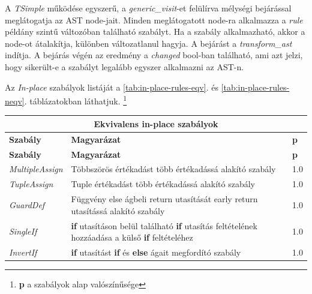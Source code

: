 A \emph{TSimple} működése egyszerű,
a \emph{generic\_visit}-et felülírva mélységi bejárással meglátogatja az AST node-jait.
Minden meglátogatott node-ra alkalmazza
a \emph{rule} példány szintű változóban található szabályt.
Ha a szabály alkalmazható, akkor a node-ot átalakítja, különben változatlanul hagyja.
A bejárást a \emph{transform\_ast} indítja.
A bejárás végén az eredmény a \emph{changed} bool-ban található,
ami azt jelzi, hogy sikerült-e a szabályt legalább egyszer alkalmazni az AST-n.

Az \emph{In-place} szabályok listáját a \ref{tab:in-place-rules-eqv}. és \ref{tab:in-place-rules-neqv}.
táblázatokban láthatjuk.
\footnote{\textbf{p} a szabályok alap valószínűsége}

\begin{center}
	\begin{longtable}{ | p{} | p{} | p{} | }
		\hline
		\multicolumn{3}{|c|}{\textbf{Ekvivalens in-place szabályok}}
		\\ \hline
		
		\textbf{Szabály} & \textbf{Magyarázat} & \textbf{p}
		\\ \hline \hline
		\endfirsthead %
		
		\hline
		\textbf{Szabály} & \textbf{Magyarázat} & \textbf{p}
		\\ \hline \hline
		\endhead %
		
		\hline
		\endfoot %
		
		\endlastfoot %
		
		\emph{MultipleAssign}
		& Többszörös értékadást több értékadássá alakító szabály
		& 1.0
		\\ \hline

		\emph{TupleAssign}
		& Tuple értékadást több értékadássá alakító szabály
		& 1.0
		\\ \hline

		\emph{GuardDef}
		& Függvény else ágbeli return utasítását early return utasítássá alakító szabály
		& 1.0
		\\ \hline

		\emph{SingleIf}
		& \textbf{if} utasításon belül található \textbf{if} utasítás feltételének hozzáadása a külső \textbf{if} feltételéhez
		& 1.0
		\\ \hline
		
		\emph{InvertIf}
		& \textbf{if} utasítást \textbf{if} és \textbf{else} ágait megfordító szabály
		& 1.0
		\\ \hline


\end{longtable}
\end{center}

